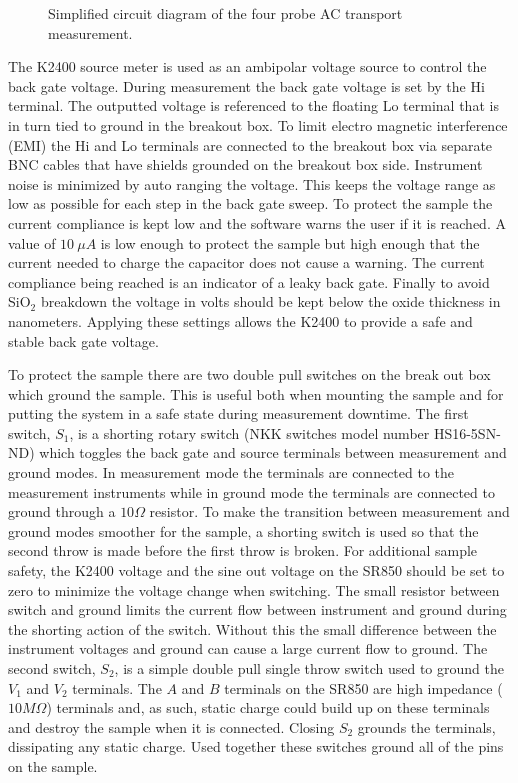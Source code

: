 \begin{figure}
	\begin{center}
	
	\end{center}
	\caption[Simplified circuit diagram of the four probe AC transport measurement]{\label{fig:elec:min}
		Simplified circuit diagram of the four probe AC transport measurement.
	}
\end{figure}

The K2400 source meter is used as an ambipolar voltage source to control the back gate voltage.
During measurement the back gate voltage is set by the Hi terminal.
The outputted voltage is referenced to the floating Lo terminal that is in turn tied to ground in the breakout box.
To limit electro magnetic interference (EMI) the Hi and Lo terminals are connected to the breakout box via separate BNC cables that have shields grounded on the breakout box side.
Instrument noise is minimized by auto ranging the voltage.
This keeps the voltage range as low as possible for each step in the back gate sweep.
To protect the sample the current compliance is kept low and the software warns the user if it is reached.
A value of $10 \ \mu A$ is low enough to protect the sample but high enough that the current needed to charge the capacitor does not cause a warning.
The current compliance being reached is an indicator of a leaky back gate.
Finally to avoid SiO$_2$ breakdown the voltage in volts should be kept below the oxide thickness in nanometers.
Applying these settings allows the K2400 to provide a safe and stable back gate voltage.

To protect the sample there are two double pull switches on the break out box which ground the sample.
This is useful both when mounting the sample and for putting the system in a safe state during measurement downtime.
The first switch, $S_1$, is a shorting rotary switch (NKK switches model number HS16-5SN-ND) which toggles the back gate and source terminals between measurement and ground modes.
In measurement mode the terminals are connected to the measurement instruments while in ground mode the terminals are connected to ground through a $10 \Omega$ resistor.
To make the transition between measurement and ground modes smoother for the sample, a shorting switch is used so that the second throw is made before the first throw is broken.
For additional sample safety, the K2400 voltage and the sine out voltage on the SR850 should be set to zero to minimize the voltage change when switching.
The small resistor between switch and ground limits the current flow between instrument and ground during the shorting action of the switch.
Without this the small difference between the instrument voltages and ground can cause a large current flow to ground.
The second switch, $S_2$, is a simple double pull single throw switch used to ground the $V_1$ and $V_2$ terminals.
The $A$ and $B$ terminals on the SR850 are high impedance ($10 M \Omega$) terminals and, as such, static charge could build up on these terminals and destroy the sample when it is connected.
Closing $S_2$ grounds the terminals, dissipating any static charge.
Used together these switches ground all of the pins on the sample.


